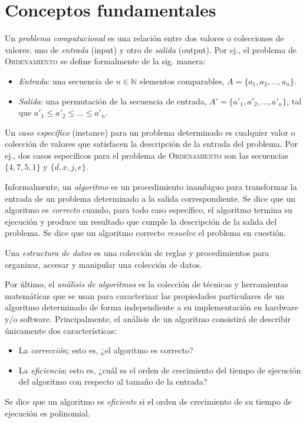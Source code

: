 \chapter{Conceptos fundamentales}

Un \emph{problema computacional} es una relación entre dos valores o colecciones de valores: uno de \emph{entrada} (input) y otro de \emph{salida} (output). Por ej., el problema de \textsc{Ordenamiento} se define formalmente de la sig. manera:
\begin{itemize}
  \item \emph{Entrada}: una secuencia de \(n\in\mathbb{N}\) elementos comparables, \(A=\{a_1,a_2,\dots,a_n\}\).
  \item \emph{Salida}: una permutación de la secuencia de entrada, \(A'=\{a'_1,a'_2,\dots,a'_n\}\), tal que \(a'_1\leq a'_2\leq\dots\leq a'_n\).
\end{itemize}
Un \emph{caso específico} (instance) para un problema determinado es cualquier valor o colección de valores que satisfacen la descripción de la entrada del problema. 
Por ej., dos casos específicos para el problema de \textsc{Ordenamiento} son las secuencias \(\{4,7,5,1\}\) y \(\{d,x,j,e\}\).

Informalmente, un \emph{algoritmo} es un procedimiento inambiguo para transformar la entrada de un problema determinado a la salida correspondiente.
Se dice que un algoritmo es \emph{correcto} cuando, para todo caso específico, el algoritmo termina su ejecución y produce un resultado que cumple la descripción de la salida del problema.
Se dice que un algoritmo correcto \emph{resuelve} el problema en cuestión.

Una \emph{estructura de datos} es una colección de reglas y procedimientos para organizar, accesar y manipular una colección de datos.

Por último,  el \emph{análisis de algoritmos} es la colección de técnicas y herramientas matemáticas que se usan para caracterizar las propiedades particulares de un algoritmo determinado de forma independiente a su implementación en hardware y/o software. 
Principalmente, el análisis de un algoritmo consistirá de describir únicamente dos características:

\begin{itemize}
  \item La \emph{corrección}; esto es, ¿el algoritmo es correcto?
  \item La \emph{eficiencia}; esto es, ¿cuál es el orden de crecimiento del 
  tiempo de ejecución del algoritmo con respecto al tamaño de la entrada?
\end{itemize}
Se dice que un algoritmo es \emph{eficiente} si el orden de crecimiento
de su tiempo de ejecución es polinomial.

